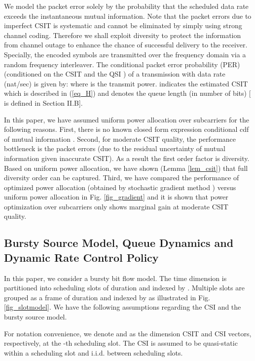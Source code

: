 \documentclass[11pt,journal, onecolumn]{./IEEEtran}
\newcommand{\blue}{\color{black}}
\newcommand{\black}{\color{black}}
\newcommand{\red}{\color{black}}
\begin{document}
\black
We model the packet error solely by the probability that the scheduled data rate exceeds the instantaneous mutual information. Note that the packet errors due to imperfect CSIT is systematic and cannot be eliminated by simply using strong channel coding. Therefore we shall exploit diversity to protect the information from channel outage to enhance the chance of successful delivery to the receiver. Specially, the encoded symbols are transmitted over the frequency domain via a random frequency interleaver. The conditional packet error probability (PER)  (conditioned on the CSIT  and the QSI ) of a transmission with data rate  (nat/sec) is given by:  where  is the transmit power.  indicates the estimated CSIT which is described in (\ref{eq_H}) and  denotes the queue length (in number of bits) [ is defined in Section II.B].

{\red
\begin{Remark}
In this paper, we have assumed uniform power allocation over subcarriers for the following reasons. First, there is no known closed form expression conditional cdf of mutual information . Second, for moderate CSIT quality, the performance bottleneck is the packet errors (due to the residual uncertainty of mutual information given inaccurate CSIT). As a result the first order factor is diversity. Based on uniform power allocation, we have shown (Lemma \ref{lem_csit}) that full diversity order can be captured. Third, we have compared the performance of optimized power allocation  {\blue (obtained by stochastic gradient method \cite{BertsekasNeuro:1996,Borkarbook:2008})} versus uniform power allocation in Fig. \ref{fig_gradient} and it is shown that power optimization over subcarriers only shows marginal gain at moderate CSIT quality. ~\hfill\IEEEQED
\end{Remark}}



\subsection{Bursty Source Model, Queue Dynamics and Dynamic Rate Control Policy}
In this paper, we consider a bursty bit flow model. The time dimension is partitioned into scheduling slots of duration  and indexed by . Multiple slots are grouped as a frame of duration  and indexed by  as illustrated in Fig. \ref{fig_slotmodel}. We have the following assumptions regarding the CSI and the bursty source model.

\begin{Assumption}
 For notation convenience, we denote  and  as the  dimension CSIT and CSI vectors, respectively, at the -th scheduling slot. The CSI  is assumed to be quasi-static within a scheduling slot and i.i.d. between scheduling slots. ~\hfill\IEEEQED
\end{Assumption}
\end{document}
